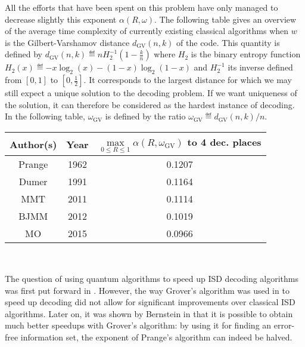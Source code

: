 All the efforts that have been spent on this problem have only managed to decrease slightly this exponent $\alpha(R,\omega)$.
The following table gives an overview of the average time complexity of currently existing classical algorithms 
when $w$ is the Gilbert-Varshamov distance $d_{\text{GV}}(n,k)$ of the code. 
This quantity is defined by $d_{\text{GV}}(n,k) \eqdef n H_2^{-1}\left(1 - \frac{k}{n}\right)$ where $H_2$ is the binary entropy function $H_2(x) \eqdef -x \log_2(x)-(1-x)\log_2(1-x)$ and $H_2^{-1}$ its inverse
defined from $[0,1]$ to $[0,\frac{1}{2}]$. It corresponds to the largest distance for which we may still expect a unique solution to the decoding problem. If we want uniqueness of the solution, it can therefore be 
considered as the hardest instance of decoding.
In the following table, $\omega_{\text{GV}}$ is defined by the ratio $\omega_{\text{GV}} \eqdef d_{\text{GV}}(n,k)/n$.
\begin{center}
      \begin{tabular}{| c | c | c |}
      \hline
      \textbf{Author(s)} & Year & $\underset{0 \leq R \leq 1}{\max}\alpha(R,\omega_{\text{GV}})$ to 4 dec. places\\
      \hline
      Prange \cite{P62} & 1962 & 0.1207 \\
      \hline
      Dumer \cite{D91} & 1991 & 0.1164 \\
      \hline
      MMT \cite{MMT11} & 2011 & 0.1114 \\
      \hline
      BJMM \cite{BJMM12} & 2012 & 0.1019\\
      \hline
      MO \cite{MO15}& 2015 &  0.0966\\
      \hline
      \end{tabular}\\
      \end{center}
The question of using quantum algorithms to speed up ISD decoding algorithms was first put forward  in \cite{OS09}.
However, the way Grover's algorithm was used in \cite[Subsec. 3.5]{OS09} to speed up decoding did not allow for significant improvements over classical ISD algorithms.
Later on, it was shown  by Bernstein in \cite{B10} that it is possible to obtain much better speedups with Grover's algorithm: by using it for finding an error-free information set, the exponent of Prange's algorithm can indeed be halved. 

